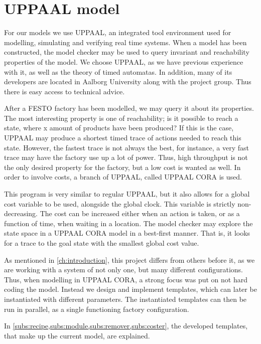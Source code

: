 \chapter{UPPAAL model}\label{ch:uppaalmodel}
For our models we use UPPAAL, an integrated tool environment used for modelling, simulating and verifying real time systems. When a model has been constructed, the model checker may be used to query invariant and reachability properties of the model. We choose UPPAAL, as we have previous experience with it, as well as the theory of timed automatas. In addition, many of its developers are located in Aalborg University along with the project group. Thus there is easy access to technical advice.

After a FESTO factory has been modelled, we may query it about its properties. The most interesting property is one of reachability; is it possible to reach a state, where x amount of products have been produced? If this is the case, UPPAAL may produce a shortest timed trace of actions needed to reach this state. However, the fastest trace is not always the best, for instance, a very fast trace may have the factory use up a lot of power. Thus, high throughput is not the only desired property for the factory, but a low cost is wanted as well. In order to involve costs, a branch of UPPAAL, called UPPAAL CORA\cite{UPPAALCORA} is used.

This program is very similar to regular UPPAAL, but it also allows for a global cost variable to be used, alongside the global clock. This variable is strictly non-decreasing. The cost can be increased either when an action is taken, or as a function of time, when waiting in a location. The model checker may explore the state space in a UPPAAL CORA model in a best-first manner. That is, it looks for a trace to the goal state with the smallest global cost value.

As mentioned in \cref{ch:introduction}, this project differs from others before it, as we are working with a system of not only one, but many different configurations. Thus, when modelling in UPPAAL CORA, a strong focus was put on not hard coding the model. Instead we design and implement templates, which can later be instantiated with different parameters. The instantiated templates can then be run in parallel, as a single functioning factory configuration.

In \cref{subs:recipe,subs:module,subs:remover,subs:coster}, the developed templates, that make up the current model, are explained.

